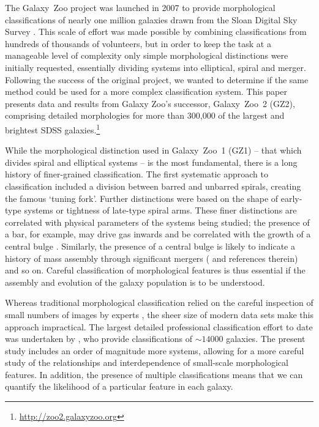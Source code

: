 \documentclass[useAMS,usenatbib]{mn2e}
\begin{document}
The Galaxy~Zoo project \citep{lin08} was launched in 2007 to provide morphological classifications of nearly one million galaxies drawn from the Sloan Digital Sky Survey \citep{yor00}. This scale of effort was made possible by combining classifications from hundreds of thousands of volunteers, but in order to keep the task at a manageable level of complexity only simple morphological distinctions were initially requested, essentially dividing systems into elliptical, spiral and merger. Following the success of the original project, we wanted to determine if the same method could be used for a more complex classification system. This paper presents data and results from Galaxy Zoo's successor, Galaxy~Zoo~2 (GZ2), comprising detailed morphologies for more than 300,000 of the largest and brightest SDSS galaxies.\footnote{\url{http://zoo2.galaxyzoo.org}}

While the morphological distinction used in Galaxy~Zoo~1 (GZ1) -- that which divides spiral and elliptical systems -- is the most fundamental, there is a long history of finer-grained classification. The first systematic approach to classification \citep{hub36} included a division between barred and unbarred spirals, creating the famous `tuning fork'. Further distinctions were based on the shape of early-type systems or tightness of late-type spiral arms. These finer distinctions are correlated with physical parameters of the systems being studied; the presence of a bar, for example, may drive gas inwards and be correlated with the growth of a central bulge \citep[a review is given in \citet{kor04} and an updated picture by][]{mas11c}. Similarly, the presence of a central bulge is likely to indicate a history of mass assembly through significant mergers (\citet{mar12} and references therein) and so on. Careful classification of morphological features is thus essential if the assembly and evolution of the galaxy population is to be understood.

Whereas traditional morphological classification relied on the careful inspection of small numbers of images by experts \citep[e.g., ][]{san61,dev91}, the sheer size of modern data sets make this approach impractical. The largest detailed professional classification effort to date was undertaken by \citet{nai10}, who provide classifications of $\sim14000$ galaxies. The present study includes an order of magnitude more systems, allowing for a more careful study of the relationships and interdependence of small-scale morphological features. In addition, the presence of multiple classifications means that we can quantify the likelihood of a particular feature in each galaxy. 
\end{document}
